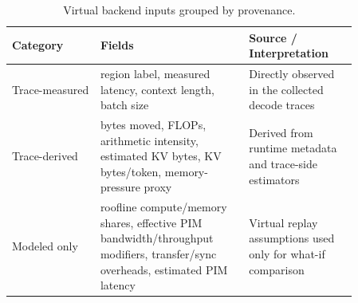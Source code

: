 \begin{table}[t]
\centering
\caption{Virtual backend inputs grouped by provenance.}
\label{tab:backend-measured-modeled}
\begin{tabular}{p{0.22\linewidth}p{0.37\linewidth}p{0.27\linewidth}}
\toprule
Category & Fields & Source / Interpretation \\
\midrule
Trace-measured & region label, measured latency, context length, batch size & Directly observed in the collected decode traces \\
Trace-derived & bytes moved, FLOPs, arithmetic intensity, estimated KV bytes, KV bytes/token, memory-pressure proxy & Derived from runtime metadata and trace-side estimators \\
Modeled only & roofline compute/memory shares, effective PIM bandwidth/throughput modifiers, transfer/sync overheads, estimated PIM latency & Virtual replay assumptions used only for what-if comparison \\
\bottomrule
\end{tabular}
\end{table}
